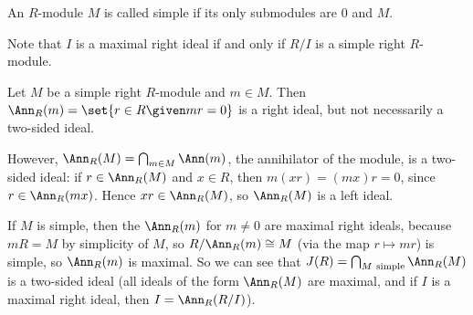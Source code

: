 An $R$-module $M$ is called simple if its only submodules are $0$ and $M$.

Note that $I$ is a maximal right ideal if and only if $R/I$ is a simple right
$R$-module.

Let $M$ be a simple right $R$-module and $m \in M$. Then
$\Ann_R(m) = \set{r \in R\given mr = 0}$ is a right ideal, but not necessarily
a two-sided ideal.

However, $\Ann_R(M) = \bigcap_{m \in M} \Ann(m)$, the annihilator of the module,
is a two-sided ideal: if $r \in \Ann_R(M)$ and $x \in R$, then $m(xr) = (mx)r = 0$,
since $r \in \Ann_R(mx)$. Hence $xr \in \Ann_R(M)$, so $\Ann_R(M)$ is a left
ideal.

If $M$ is simple, then the $\Ann_R(m)$ for $m\neq 0$ are maximal right ideals,
because $mR = M$ by simplicity of $M$, so $R/\Ann_R(m)\cong M$
(via the map $r\mapsto mr$) is simple, so $\Ann_R(m)$ is maximal. So we can see
that $J(R) = \bigcap_{M~\text{simple}} \Ann_R(M)$ is a two-sided ideal (all
ideals of the form $\Ann_R(M)$ are maximal, and if $I$ is a maximal right ideal,
then $I = \Ann_R(R/I)$).
